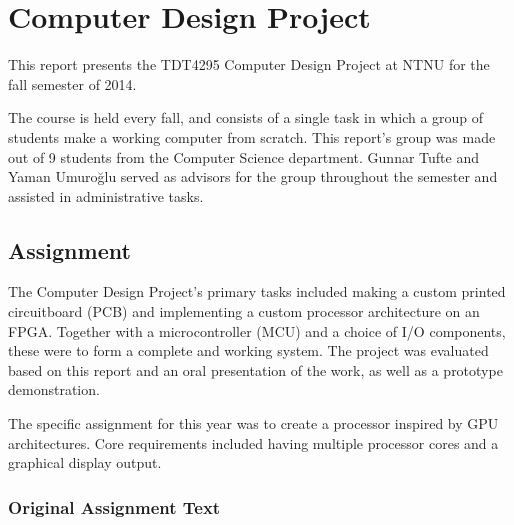 \documentclass[../main/report.tex]{subfiles}
\begin{document}
\chapter{Computer Design Project}
\label{sec:intro}

This report presents the TDT4295 Computer Design Project at NTNU for the fall semester of 2014.

The course is held every fall, and consists of a single task in which a group of students make a working computer from scratch.
This report's group was made out of 9 students from the Computer Science department.
Gunnar Tufte and Yaman Umuroğlu served as advisors for the group throughout the semester and assisted in administrative tasks.

\section{Assignment}

The Computer Design Project's primary tasks included making a custom printed circuitboard (PCB) and implementing a custom processor architecture on an FPGA.
Together with a microcontroller (MCU) and a choice of I/O components, these were to form a complete and working system.
The project was evaluated based on this report and an oral presentation of the work, as well as a prototype demonstration.

The specific assignment for this year was to create a processor inspired by GPU architectures.
Core requirements included having multiple processor cores and a graphical display output.

\newpage

\vspace*{1cm}
\subsection{Original Assignment Text}

\vspace{0.5cm}
\noindent
\end{document}
